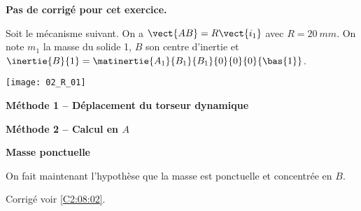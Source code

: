 \normaltrue
\correctionfalse


\setcounter{question}{0}
\ifcorrection
\else
\textbf{Pas de corrigé pour cet exercice.}
\fi

\ifprof
\else
Soit le mécanisme suivant. On a $\vect{AB}=R\vect{i_1}$ avec $R=\SI{20}{mm}$. 
On note $m_1$ la masse du solide 1, $B$ son centre d'inertie et $\inertie{B}{1}=\matinertie{A_1}{B_1}{B_1}{0}{0}{0}{\bas{1}}$.

\begin{center}
\texttt{[image: 02\_R\_01]}
\end{center}
\fi

\textbf{Méthode 1 -- Déplacement du torseur dynamique}

\ifprof
\else
\fi

\ifprof
\else
\fi

\textbf{Méthode 2 -- Calcul en $A$}


\ifprof
\else
\fi

\textbf{Masse ponctuelle}

On fait maintenant l'hypothèse que la masse est ponctuelle et concentrée en $B$.

\ifprof
\else
\fi

\ifprof
\else
\fi


\ifprof
\else
\begin{flushright}
\footnotesize{Corrigé  voir \ref{C2:08:02}.}
\end{flushright}%
\fi